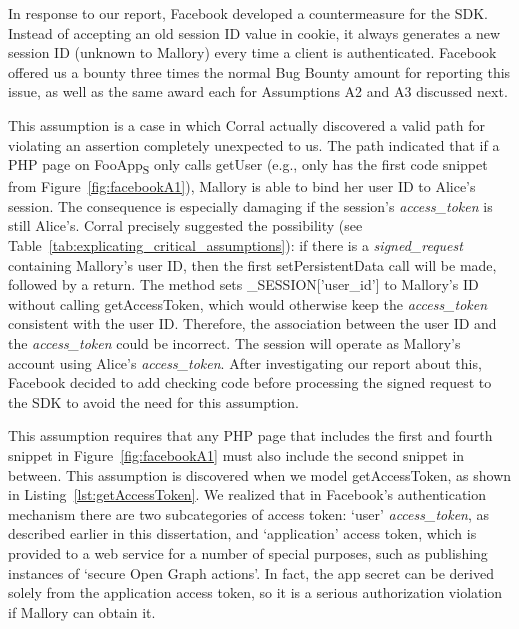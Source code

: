 In response to our report, Facebook developed a countermeasure for the SDK.  Instead of accepting an old session ID value in cookie, it always generates a new session ID (unknown to Mallory) every time a client is authenticated.  Facebook offered us a bounty three times the normal Bug Bounty amount for reporting this issue, as well as the same award each for Assumptions A2 and A3 discussed next. 

 This assumption is a case in which Corral actually discovered a valid path for violating an assertion completely unexpected to us.  The path indicated that if a PHP page on FooApp\textsubscript{S} only calls getUser (e.g., only has the first code snippet from Figure~\ref{fig:facebookA1}), Mallory is able to bind her user ID to Alice's session.  The consequence is especially damaging if the session's \emph{access\_token} is still Alice's.  Corral precisely suggested the possibility (see Table~\ref{tab:explicating_critical_assumptions}): if there is a \emph{signed\_request} containing Mallory's user ID, then the first setPersistentData call will be made, followed by a return.  The method sets \_SESSION['user\_id'] to Mallory's ID without calling getAccessToken, which would otherwise keep the \emph{access\_token} consistent with the user ID.  Therefore, the association between the user ID and the \emph{access\_token} could be incorrect. The session will operate as Mallory's account using Alice's \emph{access\_token}.  After investigating our report about this, Facebook decided to add checking code before processing the signed request to the SDK to avoid the need for this assumption.

 This assumption requires that any PHP page that includes the first and fourth snippet in Figure~\ref{fig:facebookA1} must also include the second snippet in between.  This assumption is discovered when we model getAccessToken, as shown in Listing~\ref{lst:getAccessToken}.  We realized that in Facebook's authentication mechanism there are two subcategories of access token: `user' \emph{access\_token}, as described earlier in this dissertation, and `application' access token, which is provided to a web service for a number of special purposes, such as publishing instances of `secure Open Graph actions'.  In fact, the app secret can be derived solely from the application access token, so it is a serious authorization violation if Mallory can obtain it. 



